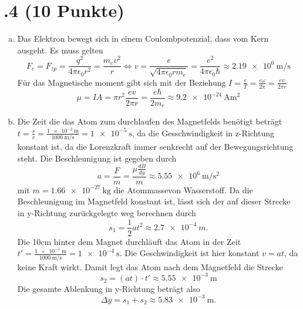 \section*{\nr.4 \titfour (10 Punkte)}
\begin{enumerate}[(a)]
\item
Das Elektron bewegt sich in einem Coulombpotenzial, dass vom Kern ausgeht. Es muss gelten
\begin{equation}
	F_c = F_{zp} = \frac{q^2}{4 \pi \epsilon_0 r^2} = \frac{m_e v^2}{r} \Leftrightarrow v =
	\frac{e}{\sqrt{4 \pi \epsilon_0 r m_e}} = \frac{e^2}{4\pi\epsilon_0\hbar} \approx \SI[per-mode=fraction] {2,19e6}{\meter \per\second}
\end{equation} 
Für das Magnetische moment gibt sich mit der Beziehung $ I = \frac{e}{T} = \frac{e \omega}{2 \pi} = \frac{e v}{2 \pi r}$
\begin{equation}
	\mu = IA = \pi r^2 \frac{e v}{2 \pi r} = \frac{e \hbar}{2 m_e} \approx \SI {9.2e-24}{\ampere\square\meter}
\end{equation}
\item
Die Zeit die das Atom zum durchlaufen des Magnetfelds benötigt beträgt $t = \frac{s}{v} = \frac{\SI{1e-2}{\meter}}{\SI{1000}{\meter\per\second}} = \SI{1e-5}{\second}$, da die Gesschwindigkeit in z-Richtung konstant ist, da die Lorenzkraft immer senkrecht auf der Bewegungsrichtung steht. Die Beschleunigung ist gegeben durch 
\begin{equation}
a = \frac{F}{m} = \frac{\mu \frac{dB}{dy}}{m} \approx \SI[per-mode=fraction] {5,55e6}{\meter\per\square\second}
\end{equation}
mit $m = \SI {1,66e-27}{\kilogram}$ die Atommassevon Wasserstoff. Da die Beschleunigung im Magnetfeld konstant ist, lässt sich der auf dieser Strecke in y-Richtung zurückgelegte weg berechnen durch 
\begin{equation}
	s_1 = \frac{1}{2}at^2 \approx \SI {2,7e-4}{m}. 
\end{equation}Die 10cm hinter dem Magnet durchläuft das Atom in der Zeit $t' = \frac{\SI{1e-1}{\meter}}{\SI{1000}{\meter\per\second}} = \SI{1e-4}{\second}$. Die Geschwindigkeit ist hier konstant $v = at$, da keine Kraft wirkt. Damit legt das Atom nach dem Magnetfeld die Strecke
\begin{equation}
	s_2 = (at)\cdot t' \approx \SI{5.55e-3}{\meter}
\end{equation}
Die gesamte Ablenkung in y-Richtung beträgt also
\begin{equation}
	\Delta y = s_1 + s_2 \approx \SI {5.83e-3}{\meter}.
\end{equation}
\end{enumerate}
